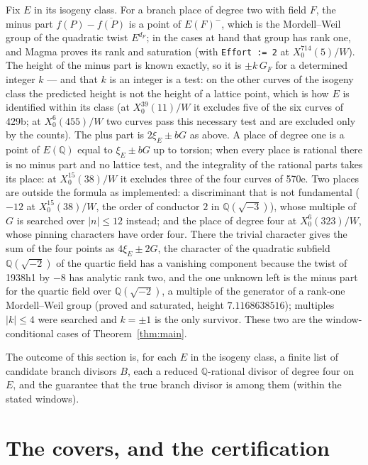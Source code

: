 \documentclass[11pt,reqno]{amsart}
\theoremstyle{plain}
\theoremstyle{definition}
\newcommand{\Q}{\mathbb{Q}}
\begin{document}
Fix $E$ in its isogeny class. For a branch place of degree two with field $F$, the minus part
$f(P)-\overline{f(P)}$ is a point of $E(F)^-$, which is the Mordell--Weil group of the quadratic
twist $E^{d_F}$; in the cases at hand that group has rank one, and Magma proves its rank and
saturation (with \texttt{Effort := 2} at $X_0^{714}(5)/W$). The height of the minus part is known
exactly, so it is $\pm k\,G_F$ for a determined integer $k$ --- and that $k$ is an integer is a
test: on the other curves of the isogeny class the predicted height is not the height of a lattice
point, which is how $E$ is identified within its class (at $X_0^{39}(11)/W$ it excludes five of the
six curves of 429b; at $X_0^6(455)/W$ two curves pass this necessary test and are excluded only by
the counts). The plus part is $2\xi_E\pm bG$ as above. A place of degree one is a point of $E(\Q)$
equal to $\xi_E\pm bG$ up to torsion; when every place is rational there is no minus part and no
lattice test, and the integrality of the rational parts takes its place: at $X_0^{15}(38)/W$ it
excludes three of the four curves of 570e. Two places are outside the formula as implemented: a
discriminant that is not fundamental ($-12$ at $X_0^{15}(38)/W$, the order of conductor $2$ in
$\Q(\sqrt{-3})$), whose multiple of $G$ is searched over $|n|\le12$ instead; and the place of
degree four at $X_0^6(323)/W$, whose pinning characters have order four. There the trivial
character gives the sum of the four points as $4\xi_E\pm2G$, the character of the quadratic
subfield $\Q(\sqrt{-2})$ of the quartic field has a vanishing component because the twist of 1938h1
by $-8$ has analytic rank two, and the one unknown left is the minus part for the quartic field
over $\Q(\sqrt{-2})$, a multiple of the generator of a rank-one Mordell--Weil group (proved and
saturated, height $7.1168638516$); multiples $|k|\le4$ were searched and $k=\pm1$ is the only
survivor. These two are the window-conditional cases of Theorem~\ref{thm:main}.

The outcome of this section is, for each $E$ in the isogeny class, a finite list of candidate
branch divisors $B$, each a reduced $\Q$-rational divisor of degree four on $E$, and the guarantee
that the true branch divisor is among them (within the stated windows).

\section{The covers, and the certification}\label{sec:covers}
\end{document}
